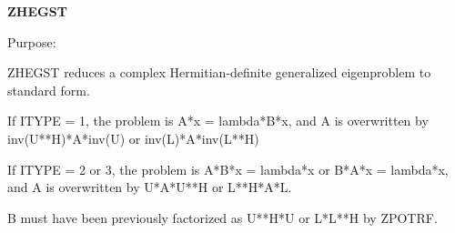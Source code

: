{\bfseries Z\+H\+E\+G\+S\+T} 

 \begin{DoxyParagraph}{Purpose\+: }
\begin{DoxyVerb} ZHEGST reduces a complex Hermitian-definite generalized
 eigenproblem to standard form.

 If ITYPE = 1, the problem is A*x = lambda*B*x,
 and A is overwritten by inv(U**H)*A*inv(U) or inv(L)*A*inv(L**H)

 If ITYPE = 2 or 3, the problem is A*B*x = lambda*x or
 B*A*x = lambda*x, and A is overwritten by U*A*U**H or L**H*A*L.

 B must have been previously factorized as U**H*U or L*L**H by ZPOTRF.\end{DoxyVerb}
 
\end{DoxyParagraph}

